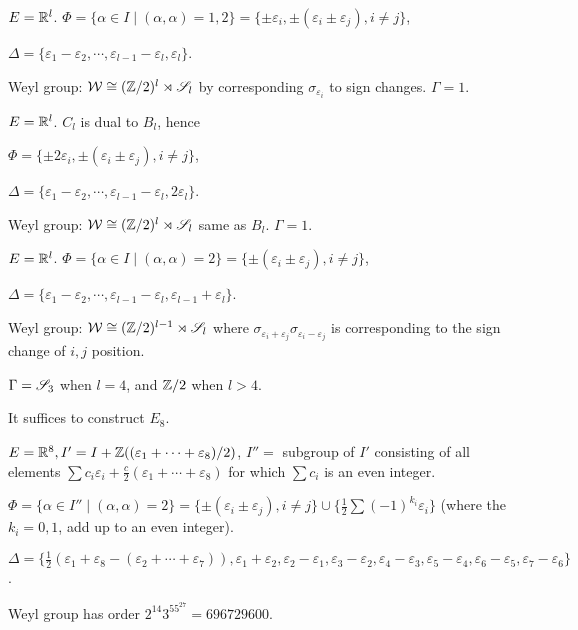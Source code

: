 \begin{exam}[$B_l(l\geqslant2)$]
  $E={\mathbb R}^l$.
  $\Phi=\{\alpha\in I\mid (\alpha,\alpha)=1, 2\}=\{\pm\varepsilon_i, \pm(\varepsilon_i\pm\varepsilon_j), i\neq j\}$,

  $\Delta=\{\varepsilon_1-\varepsilon_2,\cdots,\varepsilon_{l-1}-\varepsilon_l,\varepsilon_l\}$.

  Weyl group: ${\cal W}\cong({\mathbb Z}/2)^l\rtimes\mathscr{S}_l$ by corresponding $\sigma_{\varepsilon_i}$ to sign changes. $\Gamma=1$.
\end{exam}

\begin{exam}[$C_l(l\geqslant3)$]
  $E={\mathbb R}^l$. $C_l$ is dual to $B_l$, hence

  $\Phi=\{\pm2\varepsilon_i, \pm(\varepsilon_i\pm\varepsilon_j), i\neq j\}$,

  $\Delta=\{\varepsilon_1-\varepsilon_2,\cdots,\varepsilon_{l-1}-\varepsilon_l,2\varepsilon_l\}$.

  Weyl group: ${\cal W}\cong({\mathbb Z}/2)^l\rtimes\mathscr{S}_l$ same as $B_l$. $\Gamma=1$.
\end{exam}

\begin{exam}[$D_l(l\geqslant4)$]
  $E={\mathbb R}^l$.
  $\Phi=\{\alpha\in I\mid (\alpha,\alpha)=2\}=\{\pm(\varepsilon_i\pm\varepsilon_j), i\neq j\}$,

  $\Delta=\{\varepsilon_1-\varepsilon_2,\cdots,\varepsilon_{l-1}-\varepsilon_l, \varepsilon_{l-1}+\varepsilon_l\}$.

  Weyl group: ${\cal W}\cong({\mathbb Z}/2)^{l-1}\rtimes\mathscr{S}_l$
  where $\sigma_{\varepsilon_i+\varepsilon_j}\sigma_{\varepsilon_i-\varepsilon_j}$ is corresponding to the sign change of $i,j$ position.

  $\Gamma=\mathscr{S}_3$ when $l=4$, and ${\mathbb Z}/2$ when $l>4$.
\end{exam}

\begin{exam}[$E_6.E_7,E_8$]
  It suffices to construct $E_8$.

  $E={\mathbb R}^8, I'=I+{\mathbb Z}((\varepsilon_1+\cdots+\varepsilon_8)/2)$, $I''=$ subgroup of $I'$ consisting of all elements $\sum c_i\varepsilon_i+\frac{c}{2}(\varepsilon_1+\cdots+\varepsilon_8)$ for which $\sum c_i$ is an even integer.

  $\Phi=\{\alpha\in I''\mid (\alpha,\alpha)=2\}=\{\pm(\varepsilon_i\pm\varepsilon_j), i\neq j\}\cup\{\frac{1}{2}\sum(-1)^{k_i}\varepsilon_i\}$ (where the $k_i=0,1$, add up to an even integer).

  $\Delta=\{\frac{1}{2}(\varepsilon_1+\varepsilon_8-(\varepsilon_2+\cdots+\varepsilon_7)), \varepsilon_1+\varepsilon_2, \varepsilon_2-\varepsilon_1, \varepsilon_3-\varepsilon_2, \varepsilon_4-\varepsilon_3, \varepsilon_5-\varepsilon_4, \varepsilon_6-\varepsilon_5, \varepsilon_7-\varepsilon_6\}$.

  Weyl group has order $2^{14}3^55^27=696729600$.
\end{exam}

